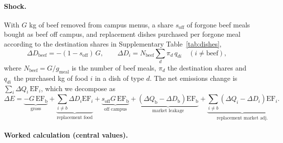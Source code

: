 \documentclass[10pt]{article}
\begin{document}
\paragraph{Shock.} With $G$ kg of beef removed from campus menus, a share
$s_{\mathrm{off}}$ of forgone beef meals bought as beef off campus, and
replacement dishes purchased per forgone meal according to the destination
shares in Supplementary Table~\ref{tab:dishes},
\begin{equation}
\Delta D_{\mathrm{beef}} = -(1-s_{\mathrm{off}})\,G, \qquad
\Delta D_{i} = N_{\mathrm{beef}} \sum_{d} \pi_d\, q_{di}\quad(i\neq \mathrm{beef}),
\end{equation}
where $N_{\mathrm{beef}}=G/g_{\mathrm{meal}}$ is the number of beef meals, $\pi_d$
the destination shares and $q_{di}$ the purchased kg of food $i$ in a dish of
type $d$. The net emissions change is $\sum_i \Delta Q_i\,\mathrm{EF}_i$, which we decompose as
\begin{equation}
\Delta E = \underbrace{-G\,\mathrm{EF}_{\mathrm{b}}}_{\text{gross}}
+ \underbrace{\textstyle\sum_{i\ne b}\Delta D_i \mathrm{EF}_i}_{\text{replacement food}}
+ \underbrace{s_{\mathrm{off}}G\,\mathrm{EF}_{\mathrm{b}}}_{\text{off campus}}
+ \underbrace{(\Delta Q_{\mathrm{b}}-\Delta D_{\mathrm{b}})\mathrm{EF}_{\mathrm{b}}}_{\text{market leakage}}
+ \underbrace{\textstyle\sum_{i\ne b}(\Delta Q_i-\Delta D_i)\mathrm{EF}_i}_{\text{replacement market adj.}} .
\end{equation}

\begin{table}[H]
\centering\small
\caption{\textbf{Market parameters.} Baseline UK consumption, supply elasticities
(short and long run) and own-price demand elasticities. Triangular distributions
on the stated ranges.}
\label{tab:markets}
\resizebox{\linewidth}{!}{}
\end{table}

\begin{table}[H]
\centering\small
\caption{\textbf{Cross-price demand elasticities} $\varepsilon_{ij}$ (row: quantity; column: price).}
\label{tab:cross}

\end{table}

\paragraph{Worked calculation (central values).}


\begin{table}[H]
\centering\small
\caption{\textbf{Campus beef removal: decomposition of the annual emissions change (t \COtwoe{} yr$^{-1}$).}
Monte Carlo median and 90\% interval (\NCampus{} draws).}
\label{tab:campus}

\end{table}
\end{document}
